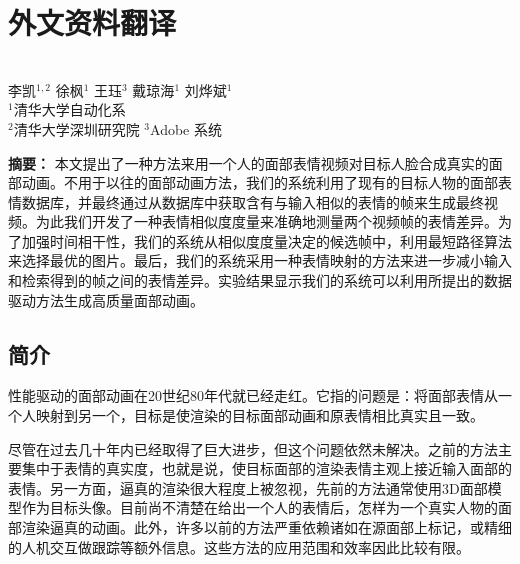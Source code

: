 
\chapter{外文资料翻译}
\pagestyle{empty}
\begin{center}
\\
\vspace{10pt}
\wuhao
李凯$^{1,2}$ \text{~~~~} 徐枫$^{1}$ \text{~~~~}王珏$^{3}$ \text{~~~~}戴琼海$^{1}$ \text{~~~~}刘烨斌$^{1}$\\
$^{1}$清华大学自动化系\\
$^{2}$清华大学深圳研究院\text{~~~}
$^{3}$Adobe 系统\\
\end{center}

\textbf{摘要：}
本文提出了一种方法来用一个人的面部表情视频对目标人脸合成真实的面部动画。不用于以往的面部动画方法，我们的系统利用了现有的目标人物的面部表情数据库，并最终通过从数据库中获取含有与输入相似的表情的帧来生成最终视频。为此我们开发了一种表情相似度度量来准确地测量两个视频帧的表情差异。为了加强时间相干性，我们的系统从相似度度量决定的候选帧中，利用最短路径算法来选择最优的图片。最后，我们的系统采用一种表情映射的方法来进一步减小输入和检索得到的帧之间的表情差异。实验结果显示我们的系统可以利用所提出的数据驱动方法生成高质量面部动画。

\section{简介}
性能驱动的面部动画在20世纪80年代就已经走红。它指的问题是：将面部表情从一个人映射到另一个，目标是使渲染的目标面部动画和原表情相比真实且一致。

尽管在过去几十年内已经取得了巨大进步，但这个问题依然未解决。之前的方法主要集中于表情的真实度，也就是说，使目标面部的渲染表情主观上接近输入面部的表情。另一方面，逼真的渲染很大程度上被忽视，先前的方法通常使用3D面部模型作为目标头像。目前尚不清楚在给出一个人的表情后，怎样为一个真实人物的面部渲染逼真的动画。此外，许多以前的方法严重依赖诸如在源面部上标记\cite{feature_based, eri}，或精细的人机交互做跟踪\cite{performance_driven, drawing}等额外信息。这些方法的应用范围和效率因此比较有限。

